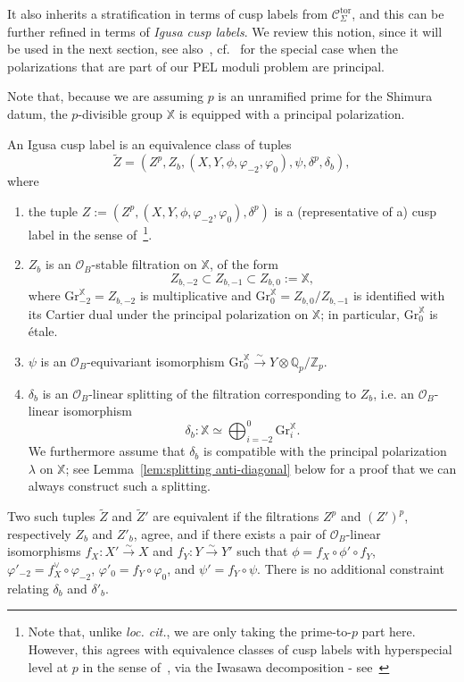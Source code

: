 \documentclass[letterpaper,11pt]{amsart}
\begin{document}
It also inherits a stratification in terms of cusp labels from $\mathscr{C}^{\mathrm{tor}}_{\Sigma}$, and this can be further refined in terms of \emph{Igusa cusp labels}. We review this notion, since it will be used in the next section, see also~\cite[Definition 3.2.15]{santos}, cf.~\cite[Definition 3.3.10]{CS2} for the special case when the polarizations that are part of our PEL moduli problem are principal. 


Note that, because we are assuming $p$ is an unramified prime for the Shimura datum, the $p$-divisible group $\mathbb{X}$ is equipped with a principal polarization. 

\begin{definition}\label{defn: IgusaCuspLabel} An Igusa cusp label is an equivalence class of tuples 
\[
\widetilde{Z} = (Z^p, Z_b, (X,Y,\phi, \varphi_{-2},\varphi_{0}), \psi, \delta^p, \delta_b),
\] 
where
\begin{enumerate}
\item the tuple $Z:=(Z^p, (X,Y,\phi, \varphi_{-2},\varphi_{0}),\delta^p)$ is a (representative of a) cusp label in the sense of~\cite[\S 5.4.1]{lan-thesis}\footnote{Note that, unlike \emph{loc. cit.}, we are only taking the prime-to-$p$ part here. However, this agrees with equivalence classes of cusp labels with hyperspecial level at $p$ in the sense of~\cite{lan-thesis}, via the Iwasawa decomposition - see~\cite[Lemma A.4.7]{Lan-ANT}}. 
\item $Z_b$ is an $\mathcal{O}_{B}$-stable filtration on $\mathbb{X}$, of the form 
\[
Z_{b,-2}\subset Z_{b,-1}\subset Z_{b,0}:=\mathbb{X},
\] 
where $\mathrm{Gr}_{-2}^{\mathbb{X}} = Z_{b,-2}$ is multiplicative and $\mathrm{Gr}_{0}^{\mathbb{X}} = Z_{b,0}/Z_{b,-1}$ is identified with its Cartier dual under the principal polarization on $\mathbb{X}$; in particular, $\mathrm{Gr}_0^{\mathbb{X}}$ is \'etale. 
\item $\psi$ is an $\mathcal{O}_{B}$-equivariant isomorphism 
$\mathrm{Gr}_0^{\mathbb{X}}\stackrel{\sim}{\to} Y\otimes \mathbb{Q}_p/\mathbb{Z}_p$. 
\item $\delta_b$ is an $\mathcal{O}_{B}$-linear splitting of the filtration corresponding to $Z_b$, i.e. an $\mathcal{O}_B$-linear isomorphism  
\[
\delta_b:\mathbb{X}\simeq \bigoplus_{i=-2}^0 \mathrm{Gr}_i^{\mathbb{X}}.
\]
We furthermore assume that $\delta_b$ is compatible with the principal polarization $\lambda$ on $\mathbb{X}$; see Lemma~\ref{lem:splitting anti-diagonal} below for a proof that we can always construct such a splitting. 
\end{enumerate}
Two such tuples $\widetilde{Z}$ and $\widetilde{Z}'$ are equivalent if the filtrations $Z^p$ and $(Z')^{p}$, respectively $Z_b$ and $Z'_b$, agree, and if there exists a pair of $\mathcal{O}_B$-linear isomorphisms $f_X:X'\stackrel{\sim}{\to} X$ and $f_Y:Y\stackrel{\sim}{\to}Y'$ such that $\phi = f_X\circ \phi'\circ f_Y$, $\varphi'_{-2} =f_X^{\vee}\circ \varphi_{-2} $, $\varphi'_{0} =f_Y\circ \varphi_0$, and $\psi' = f_Y\circ \psi$. There is no additional constraint relating $\delta_b$ and $\delta'_b$. 
\end{definition}
\end{document}
